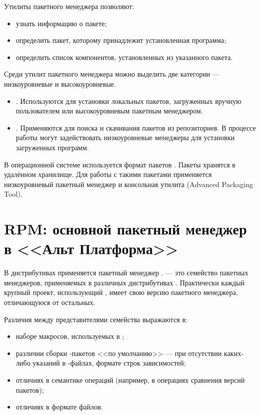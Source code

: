 Утилиты пакетного менеджера позволяют:

\begin{itemize}
	\item узнать информацию о пакете;
	\item определить пакет, которому принадлежит установленная программа;
	\item определить список компонентов, установленных из указанного пакета.
\end{itemize}

Среди утилит пакетного менеджера можно выделить две категории --- низкоуровневые и высокоуровневые.

\begin{itemize}
	\item {}. Используются для установки
	локальных пакетов, загруженных вручную пользователем или высокоуровневым пакетным менеджером.
	\item {}. Применяются для поиска и скачивания пакетов из репозиториев.
	В процессе работы могут задействовать низкоуровневые менеджеры для установки загруженных программ.
\end{itemize}

В операционной системе  используется формат пакетов . 
Пакеты  хранятся в удалённом хранилище.
Для работы с такими пакетами применяется низкоуровневый пакетный менеджер  
и консольная утилита  (Advanced Packaging Tool). 


\section{RPM: основной пакетный менеджер в <<Альт Платформа>>}
В дистрибутивах  применяется пакетный менеджер .  --- 
это семейство пакетных менеджеров, применяемых в различных дистрибутивах . 
Практически каждый крупный проект, использующий , имеет свою версию пакетного менеджера, 
отличающуюся от остальных.

Различия между представителями семейства  выражаются в:

\begin{itemize}
	\item наборе макросов, используемых в ;
	\item различии сборки -пакетов <<по умолчанию>> --- при отсутствии каких-либо 
	указаний в -файлах, формате строк зависимостей;
	\item отличиях в семантике операций (например, в операциях сравнения версий пакетов);
	\item отличиях в формате файлов.
\end{itemize}

